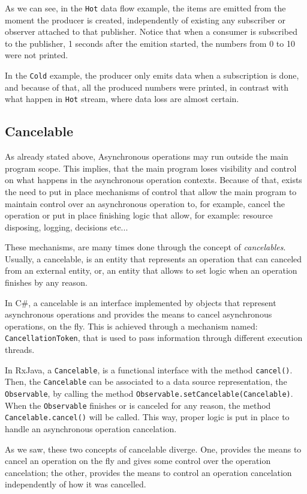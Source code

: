 	As we can see, in the \texttt{Hot} data flow example, the items are emitted from the moment the producer is created, independently of existing any subscriber or observer attached to that publisher. Notice that when a consumer is subscribed to the publisher, 1 seconds after the emition started, the numbers from 0 to 10 were not printed.
	
	In the \texttt{Cold} example, the producer only emits data when a subscription is done, and because of that, all the produced numbers were printed, in contrast with what happen in \texttt{Hot} stream, where data loss are almost certain. 
	\clearpage
	\subsection{Cancelable} 
	As already stated above, Asynchronous operations may run outside the main program scope. 
	This implies, that the main program loses visibility and control on what happens in the asynchronous operation contexts.
	Because of that, exists the need to put in place mechanisms of control that allow the main program to maintain control over an asynchronous operation to, for example, cancel the operation or put in place finishing logic that allow, for example: resource disposing, logging, decisions etc...

	These mechanisms, are many times done through the concept of \textit{cancelables}. 
	Usually, a cancelable, is an entity that represents an operation that can canceled from an external entity, or, an entity that allows to set logic when an operation finishes by any reason.
 
	In C\#, a cancelable is an interface implemented by objects that represent asynchronous operations and provides the means to cancel asynchronous operations, on the fly. 
	This is achieved through a mechanism named: \texttt{CancellationToken}, that is used to pass information through different execution threads. 
	
	In RxJava, a \texttt{Cancelable}, is a functional interface with the method \texttt{cancel()}. Then, the \texttt{Cancelable} can be associated to a data source representation, the \texttt{Observable}, by calling the method \texttt{Observable.setCancelable(Cancelable)}. 
	When the \texttt{Observable} finishes or is canceled for any reason, the method \texttt{Cancelable.cancel()} will be called. 
	This way,  proper logic is put in place to handle an asynchronous operation cancelation.
	
	As we saw, these two concepts of cancelable diverge. One, provides the means to cancel an operation on the fly and gives some control over the operation cancelation; the other, provides the means to control an operation cancelation independently of how it was cancelled.
	
